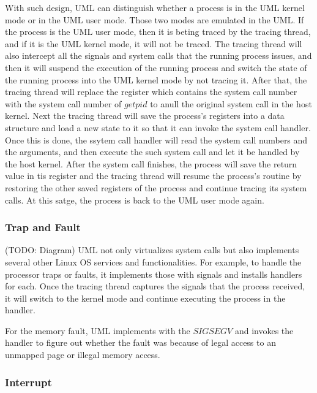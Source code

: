 With such design, UML can distinguish whether a process is in the UML kernel mode or in the UML user mode. Those two modes are emulated in the UML. If the process is the UML user mode, then it is beting traced by the tracing thread, and if it is the UML kernel mode, it will not be traced. The tracing thread will also intercept all the signals and system calls that the running process issues, and then it will suspend the execution of the running process and switch the state of the running process into the UML kernel mode by not tracing it. After that, the tracing thread will replace the register which contains the system call number with the system call number of $getpid$ to anull the original system call in the host kernel. Next the tracing thread will save the process's registers into a data structure and load a new state to it so that it can invoke the system call handler. Once this is done, the ssytem call handler will read the system call numbers and the arguments, and then execute the such system call and let it be handled by the host kernel. After the system call finishes, the process will save the return value in tis register and the tracing thread will resume the process's routine by restoring the other saved registers of the process and continue tracing its system calls. At this satge, the process is back to the UML user mode again.   

\subsubsection{Trap and Fault}

(TODO: Diagram)
UML not only virtualizes system calls but also implements several other Linux OS services and functionalities. For example, to handle the processor traps or faults, it implements those with signals and installs handlers for each. Once the tracing thread captures the signals that the process received, it will switch to the kernel mode and continue executing the process in the handler.

For the memory fault, UML implements with the $SIGSEGV$ and invokes the handler to figure out whether the fault was because of legal access to an unmapped page or illegal memory access. 

\subsubsection{Interrupt}


